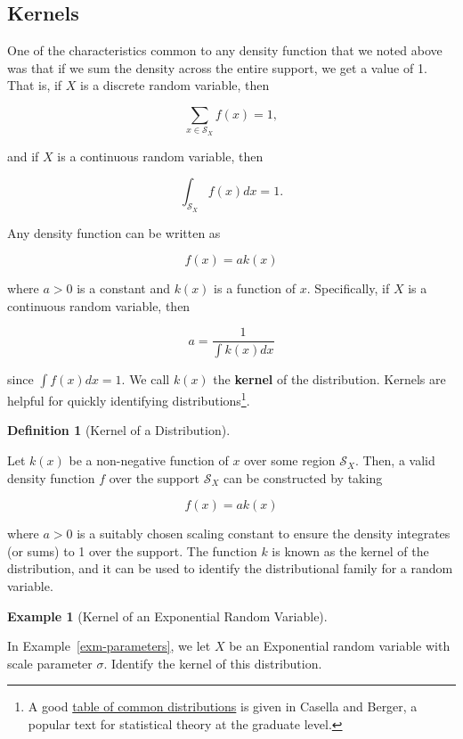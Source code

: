 \documentclass[
  letterpaper,
  DIV=11,
  numbers=noendperiod]{scrreprt}
\theoremstyle{definition}
\newtheorem{definition}{Definition}[chapter]
\theoremstyle{plain}
\theoremstyle{definition}
\newtheorem{example}{Example}[chapter]
\theoremstyle{remark}
\begin{document}
\hypertarget{kernels}{%
\subsection{Kernels}\label{kernels}}

One of the characteristics common to any density function that we noted
above was that if we sum the density across the entire support, we get a
value of 1. That is, if \(X\) is a discrete random variable, then

\[\sum_{x \in \mathcal{S}_X} f(x) = 1,\]

and if \(X\) is a continuous random variable, then

\[\int_{\mathcal{S}_X} f(x) dx = 1.\]

Any density function can be written as

\[f(x) = a k(x)\]

where \(a > 0\) is a constant and \(k(x)\) is a function of \(x\).
Specifically, if \(X\) is a continuous random variable, then

\[a = \frac{1}{\int k(x) dx}\]

since \(\int f(x) dx = 1\). We call \(k(x)\) the \textbf{kernel} of the
distribution. Kernels are helpful for quickly identifying
distributions\footnote{A good
  \href{https://qiangbo-workspace.oss-cn-shanghai.aliyuncs.com/2018-11-11-common-probability-distributions/distab.pdf}{table
  of common distributions} is given in Casella and Berger, a popular
  text for statistical theory at the graduate level.}.

\begin{definition}[Kernel of a
Distribution]\protect\hypertarget{def-kernel}{}\label{def-kernel}

Let \(k(x)\) be a non-negative function of \(x\) over some region
\(\mathcal{S}_X\). Then, a valid density function \(f\) over the support
\(\mathcal{S}_X\) can be constructed by taking

\[f(x) = a k(x)\]

where \(a > 0\) is a suitably chosen scaling constant to ensure the
density integrates (or sums) to 1 over the support. The function \(k\)
is known as the kernel of the distribution, and it can be used to
identify the distributional family for a random variable.

\end{definition}

\begin{example}[Kernel of an Exponential Random
Variable]\protect\hypertarget{exm-kernel}{}\label{exm-kernel}

In Example~\ref{exm-parameters}, we let \(X\) be an Exponential random
variable with scale parameter \(\sigma\). Identify the kernel of this
distribution.

\end{example}
\end{document}

